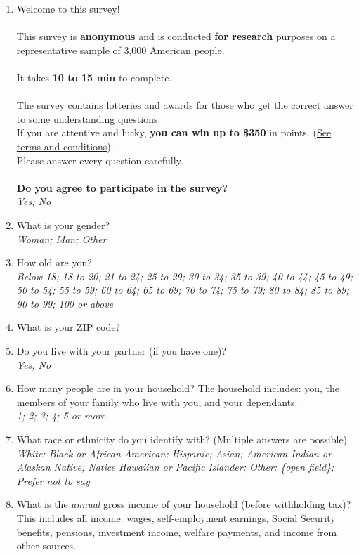 \begin{enumerate}[resume] 
\item Welcome to this survey!\\
\\
This survey is \textbf{anonymous} and is conducted \textbf{for research} purposes on a representative sample of 3,000 American people.\\
 \\
It takes \textbf{10 to 15 min} to complete.  \\
 \\
The survey contains lotteries and awards for those who get the correct answer to some understanding questions.\\
If you are attentive and lucky, \textbf{you can win up to \$350} in points. (\href{https://uvafeb.eu.qualtrics.com/WRQualtricsControlPanel/File.php?F=F_cBZAXTgNktGZbee&download=1}{See terms and conditions}).    \\
Please answer every question carefully.  \\
 \\
\textbf{Do you agree to participate in the survey?}
\\ \textit{Yes; No}
\item What is your gender?
\\ \textit{Woman; Man; Other}
\item How old are you?
\\ \textit{Below 18; 18 to 20; 21 to 24; 25 to 29; 30 to 34; 35 to 39; 40 to 44; 45 to 49; 50 to 54; 55 to 59; 60 to 64; 65 to 69; 70 to 74; 75 to 79; 80 to 84; 85 to 89; 90 to 99; 100 or above}
\item What is your ZIP code?%
\item Do you live with your partner (if you have one)?
\\ \textit{Yes; No}
\item How many people are in your household? The household includes: you, the members of your family who live with you, and your dependants. %
\\ \textit{1; 2; 3; 4; 5 or more}
\item What race or ethnicity do you identify with? (Multiple answers are possible) 
\\ \textit{White; Black or African American; Hispanic; Asian; American Indian or Alaskan Native; Natice Hawaiian or Pacific Islander; Other: \{open field\}; Prefer not to say}
\item What is the \textit{annual} gross income of your household (before withholding tax)? This includes all income: wages, self-employment earnings, Social Security benefits, pensions, investment income, welfare payments, and income from other sources. %

\end{enumerate}
